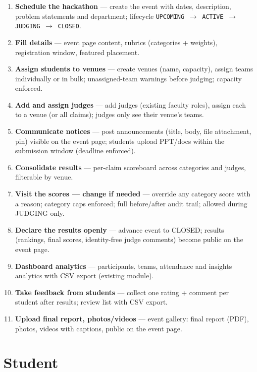 \documentclass[11pt,a4paper]{article}
\begin{document}
\begin{enumerate}
  \item \textbf{Schedule the hackathon} --- create the event with dates, description, problem statements and department; lifecycle \texttt{UPCOMING $\rightarrow$ ACTIVE $\rightarrow$ JUDGING $\rightarrow$ CLOSED}.
  \item \textbf{Fill details} --- event page content, rubrics (categories + weights), registration window, featured placement.
  \item \textbf{Assign students to venues} --- create venues (name, capacity), assign teams individually or in bulk; unassigned-team warnings before judging; capacity enforced.
  \item \textbf{Add and assign judges} --- add judges (existing faculty roles), assign each to a venue (or all claims); judges only see their venue's teams.
  \item \textbf{Communicate notices} --- post announcements (title, body, file attachment, pin) visible on the event page; students upload PPT/docs within the submission window (deadline enforced).
  \item \textbf{Consolidate results} --- per-claim scoreboard across categories and judges, filterable by venue.
  \item \textbf{Visit the scores --- change if needed} --- override any category score with a reason; category caps enforced; full before/after audit trail; allowed during JUDGING only.
  \item \textbf{Declare the results openly} --- advance event to CLOSED; results (rankings, final scores, identity-free judge comments) become public on the event page.
  \item \textbf{Dashboard analytics} --- participants, teams, attendance and insights analytics with CSV export (existing module).
  \item \textbf{Take feedback from students} --- collect one rating + comment per student after results; review list with CSV export.
  \item \textbf{Upload final report, photos/videos} --- event gallery: final report (PDF), photos, videos with captions, public on the event page.
\end{enumerate}

\section{Student}
\end{document}
